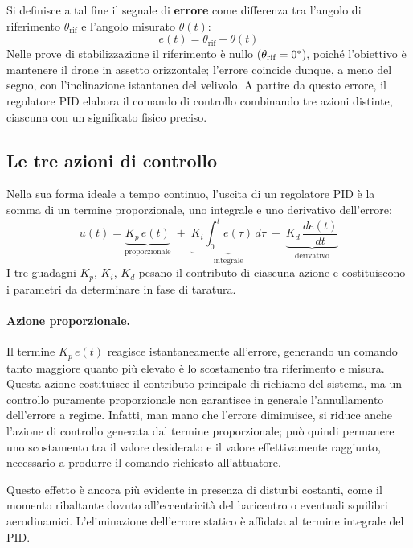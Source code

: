 \documentclass[11pt]{report}
\begin{document}
Si definisce a tal fine il segnale di \textbf{errore} come differenza tra l'angolo di riferimento $\theta_\text{rif}$ e l'angolo misurato $\theta(t)$:
\begin{equation}
	e(t) = \theta_\text{rif} - \theta(t)
	\label{eq:errore_pid}
\end{equation}
Nelle prove di stabilizzazione il riferimento è nullo ($\theta_\text{rif} = 0\degree$), poiché l'obiettivo è mantenere il drone in assetto orizzontale; l'errore coincide dunque, a meno del segno, con l'inclinazione istantanea del velivolo. A partire da questo errore, il regolatore PID elabora il comando di controllo combinando tre azioni distinte, ciascuna con un significato fisico preciso.

\subsection{Le tre azioni di controllo}
\label{sec:tre_azioni}

Nella sua forma ideale a tempo continuo, l'uscita di un regolatore PID è la somma di un termine proporzionale, uno integrale e uno derivativo dell'errore:
\begin{equation}
	u(t) = \underbrace{K_p \, e(t)}_{\text{proporzionale}}
	\; + \; \underbrace{K_i \int_{0}^{t} e(\tau)\, d\tau}_{\text{integrale}}
	\; + \; \underbrace{K_d \, \frac{d e(t)}{d t}}_{\text{derivativo}}
	\label{eq:pid_ideale}
\end{equation}
I tre guadagni $K_p$, $K_i$, $K_d$ pesano il contributo di ciascuna azione e costituiscono i parametri da determinare in fase di taratura.

\paragraph{Azione proporzionale.}
Il termine $K_p \, e(t)$ reagisce istantaneamente all'errore, generando un comando tanto maggiore quanto più elevato è lo scostamento tra riferimento e misura. Questa azione costituisce il contributo principale di richiamo del sistema, ma un controllo puramente proporzionale non garantisce in generale l'annullamento dell'errore a regime. Infatti, man mano che l'errore diminuisce, si riduce anche l'azione di controllo generata dal termine proporzionale; può quindi permanere uno scostamento tra il valore desiderato e il valore effettivamente raggiunto, necessario a produrre il comando richiesto all'attuatore.

Questo effetto è ancora più evidente in presenza di disturbi costanti, come il momento ribaltante dovuto all'eccentricità del baricentro o eventuali squilibri aerodinamici. L'eliminazione dell'errore statico è affidata al termine integrale del PID.
\end{document}
